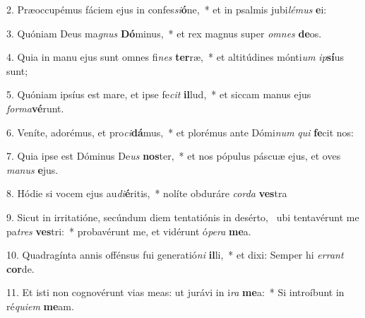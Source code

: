 2. Præoccupémus fáciem ejus in confes\textit{si}\textbf{ó}ne,~*  et in psalmis jubi\textit{lé}\textit{mus} \textbf{e}i:\

3. Quóniam Deus ma\textit{gnus} \textbf{Dó}minus,~*  et rex magnus super \textit{om}\textit{nes} \textbf{de}os.\

4. Quia in manu ejus sunt omnes fi\textit{nes} \textbf{ter}ræ,~*  et altitúdines mónti\textit{um} \textit{ip}\textbf{sí}us sunt;\

5. Quóniam ipsíus est mare, et ipse fe\textit{cit} \textbf{il}lud,~*  et siccam manus ejus \textit{for}\textit{ma}\textbf{vé}runt.\

6. Veníte, adorémus, et pro\textit{ci}\textbf{dá}mus,~*  et plorémus ante Dómi\textit{num} \textit{qui} \textbf{fe}cit nos:\

7. Quia ipse est Dóminus De\textit{us} \textbf{nos}ter,~*  et nos pópulus páscuæ ejus, et oves \textit{ma}\textit{nus} \textbf{e}jus.\

8. Hódie si vocem ejus au\textit{di}\textbf{é}ritis,~*  nolíte obduráre \textit{cor}\textit{da} \textbf{ves}tra\

9. Sicut in irritatióne, secúndum diem tentatiónis in desérto, \dag\  ubi tentavérunt me pa\textit{tres} \textbf{ves}tri:~*  probavérunt me, et vidérunt ó\textit{pe}\textit{ra} \textbf{me}a.\

10. Quadragínta annis offénsus fui generatió\textit{ni} \textbf{il}li,~*  et dixi: Semper hi \textit{er}\textit{rant} \textbf{cor}de.\

11. Et isti non cognovérunt vias meas: ut jurávi in i\textit{ra} \textbf{me}a:~*  Si introíbunt in ré\textit{qui}\textit{em} \textbf{me}am.\

